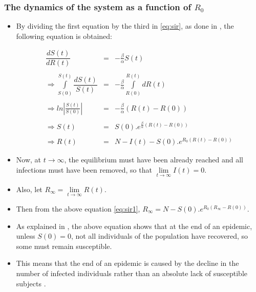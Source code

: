 \documentclass[11pt, a4paper, twoside]{report}
\begin{document}
\subsubsection{The dynamics of the system as a function of $R_0$}

\begin{itemize}

\item By dividing the first equation by the third in \ref{eq:sir}, as done in \cite{bib:wiki2}, the following equation is obtained:

\begin{equation}
\begin{array}{rcl} 
\dfrac{dS(t)}{dR(t)} &=& -\frac{\beta}{\alpha} S(t) \\ \\
\Rightarrow \int\limits_{S(0)}^{S(t)} \dfrac{dS(t)}{S(t)} &=& -\frac{\beta}{\alpha} \int\limits_{R(0)}^{R(t)} dR(t) \\ \\
\Rightarrow ln \left|\frac{S(t)}{S(0)}\right| &=& -\frac{\beta}{\alpha} \left(R(t)-R(0)\right) \\ \\
\Rightarrow S(t) &=& S(0).e^ {\frac{\beta}{\alpha}\left(R(t)-R(0)\right)} \\ \\
\Rightarrow R(t) &=& N-I(t)-S(0).e^{R_0\left(R(t)-R(0)\right)}
\end{array}
\label{eq:sir1}
\end{equation}

\item Now, at $t \to \infty$, the equilibrium must have been already reached and all infections must have been removed, so that $\lim\limits_{t\to\infty} I(t) =0$. 

\item Also, let $R_{\infty} = \lim\limits_{t\to\infty} R(t)$. 

\item Then from the above equation \ref{eq:sir1}, $R_{\infty}= N-S(0).e^{R_0\left(R_{\infty}-R(0)\right)}$.
 
\item As explained in \cite{bib:wiki2}, the above equation shows that at the end of an epidemic, unless $S(0)=0$, not all individuals of the population have recovered, so some must remain susceptible. 

\item This means that the end of an epidemic is caused by the decline in the number of infected individuals rather than an absolute lack of susceptible subjects \cite{bib:wiki2}. 


\end{itemize}
\end{document}
